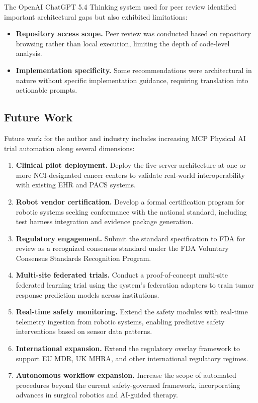 The OpenAI ChatGPT 5.4 Thinking system used for peer review identified important architectural gaps but also exhibited limitations:

\begin{itemize}[leftmargin=*]
\item \textbf{Repository access scope.} Peer review was conducted based on repository browsing rather than local execution, limiting the depth of code-level analysis.
\item \textbf{Implementation specificity.} Some recommendations were architectural in nature without specific implementation guidance, requiring translation into actionable prompts.
\end{itemize}

\subsection{Future Work}

Future work for the author and industry includes increasing MCP Physical AI trial automation along several dimensions:

\begin{enumerate}[leftmargin=*]
\item \textbf{Clinical pilot deployment.} Deploy the five-server architecture at one or more NCI-designated cancer centers to validate real-world interoperability with existing EHR and PACS systems.

\item \textbf{Robot vendor certification.} Develop a formal certification program for robotic systems seeking conformance with the national standard, including test harness integration and evidence package generation.

\item \textbf{Regulatory engagement.} Submit the standard specification to FDA for review as a recognized consensus standard under the FDA Voluntary Consensus Standards Recognition Program.

\item \textbf{Multi-site federated trials.} Conduct a proof-of-concept multi-site federated learning trial using the system's federation adapters to train tumor response prediction models across institutions.

\item \textbf{Real-time safety monitoring.} Extend the safety modules with real-time telemetry ingestion from robotic systems, enabling predictive safety interventions based on sensor data patterns.

\item \textbf{International expansion.} Extend the regulatory overlay framework to support EU MDR, UK MHRA, and other international regulatory regimes.

\item \textbf{Autonomous workflow expansion.} Increase the scope of automated procedures beyond the current safety-governed framework, incorporating advances in surgical robotics and AI-guided therapy.
\end{enumerate}

